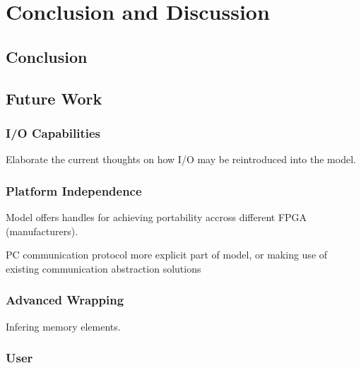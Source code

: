 \documentclass[main.tex]{subfiles}
\begin{document}
\chapter{Conclusion and Discussion}

\section{Conclusion}

\section{Future Work}
\label{section:futurework}

\subsection{I/O Capabilities}
Elaborate the current thoughts on how I/O may be reintroduced into the model.

\subsection{Platform Independence}
Model offers handles for achieving portability accross different FPGA (manufacturers).

PC communication protocol more explicit part of model, or making use of existing communication abstraction solutions

\subsection{Advanced Wrapping}
Infering memory elements.

\subsection{User }
\end{document}
